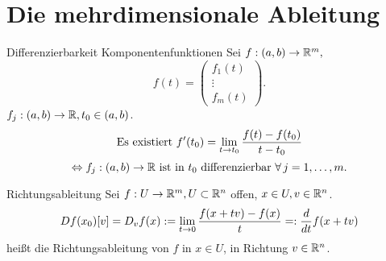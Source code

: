 \documentclass[main.tex]{subfiles}
\begin{document}
\section*{Die mehrdimensionale Ableitung}

\begin{karte}{Differenzierbarkeit Komponentenfunktionen}
    Sei \( f : (a,b) \rightarrow \mathbb{R}^m, \) 
    \[f(t) = \begin{pmatrix}
        f_1(t)\\
        \vdots \\
        f_m(t)
    \end{pmatrix}. \]
    \( f_j : (a,b) \rightarrow \mathbb{R}, t_0 \in (a,b) \).
    \[ \text{Es existiert } f'(t_0) = \lim\limits_{t\rightarrow t_0} \frac{f(t) - f(t_0)}{t - t_0} \]
    \[ \Leftrightarrow \abb{f_j}{(a,b)}{\R} 
    \text{ ist in \(t_0\) differenzierbar } \forall j=1,\ldots,m. \]
\end{karte}

\begin{karte}{Richtungsableitung}
    Sei \( f : U \rightarrow \mathbb{R}^m, U \subset \mathbb{R}^n \) offen, 
    \( x \in U, v \in \mathbb{R}^n \).
    \[ Df (x_0)[v] = 
    D_v f(x) := \lim\limits_{t\rightarrow 0} \frac{f(x + tv) - f(x)}{t} 
    =: \frac{d}{dt} f(x + tv) \]
    heißt die Richtungsableitung von \( f \) in \( x\in U \), 
    in Richtung \( v \in \mathbb{R}^n \).
\end{karte}
\end{document}
